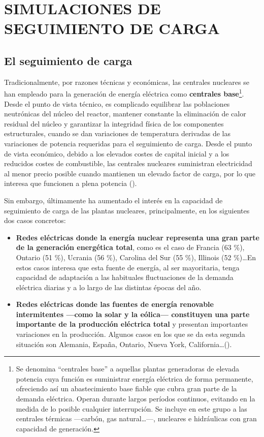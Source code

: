 \newpage
\section{SIMULACIONES DE SEGUIMIENTO DE CARGA} \label{simulaciones_seguimiento_de_carga}

\subsection{El seguimiento de carga} \label{seguimiento_de_carga}

Tradicionalmente, por razones técnicas y económicas, las centrales nucleares se han empleado para la generación de energía eléctrica como \textbf{centrales base}\footnote{Se denomina ``centrales base'' a aquellas plantas generadoras de elevada potencia cuya función es suministrar energía eléctrica de forma permanente, ofreciendo así un abastecimiento base fiable que cubra gran parte de la demanda eléctrica. Operan durante largos períodos continuos, evitando en la medida de lo posible cualquier interrupción. Se incluye en este grupo a las centrales térmicas ---carbón, gas natural\dots---, nucleares e hidráulicas con gran capacidad de generación.}. Desde el punto de vista técnico, es complicado equilibrar las poblaciones neutrónicas del núcleo del reactor, mantener constante la eliminación de calor residual del núcleo y garantizar la integridad física de los componentes estructurales, cuando se dan variaciones de temperatura derivadas de las variaciones de potencia requeridas para el seguimiento de carga. Desde el punto de vista económico, debido a los elevados costes de capital inicial y a los reducidos costes de combustible, las centrales nucleares suministran electricidad al menor precio posible cuando mantienen un elevado \gls{factor de carga}, por lo que interesa que funcionen a plena potencia (\cite{stanford_load_following}).

Sin embargo, últimamente ha aumentado el interés en la capacidad de seguimiento de carga de las plantas nucleares, principalmente, en los siguientes dos casos concretos:

\begin{itemize}
  \item \textbf{Redes eléctricas donde la energía nuclear representa una gran parte de la generación energética total}, como es el caso de Francia (63 \%), Ontario (51 \%), Ucrania (56 \%), Carolina del Sur (55 \%), Illinois (52 \%)\dots  En estos casos interesa que esta fuente de energía, al ser mayoritaria, tenga capacidad de adaptación a las habituales fluctuaciones de la demanda eléctrica diarias y a lo largo de las distintas épocas del año.
  \item \textbf{Redes eléctricas donde las fuentes de energía renovable intermitentes ---como la solar y la eólica--- constituyen una parte importante de la producción eléctrica total} y presentan importantes variaciones en la producción. Algunos casos en los que se da esta segunda situación son Alemania, España, Ontario, Nueva York, California\dots (\cite{ANS_2019}).
\end{itemize} 

